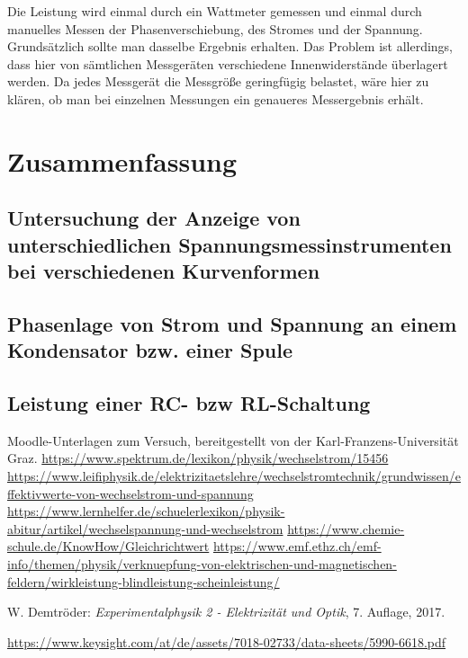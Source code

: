 \documentclass{article}
\begin{document}
Die Leistung wird einmal durch ein Wattmeter gemessen und einmal durch manuelles Messen der Phasenverschiebung, des Stromes und der Spannung. Grundsätzlich sollte man dasselbe Ergebnis erhalten. Das Problem ist allerdings, dass hier von sämtlichen Messgeräten verschiedene Innenwiderstände überlagert werden.  Da jedes Messgerät die Messgröße geringfügig belastet, wäre hier zu klären, ob man bei einzelnen Messungen ein genaueres Messergebnis erhält. 



\section{Zusammenfassung}

\subsection{Untersuchung  der  Anzeige  von  unterschiedlichen  Spannungsmessinstrumenten  bei verschiedenen Kurvenformen }






\subsection{Phasenlage von Strom und Spannung an einem Kondensator bzw. einer Spule}


\subsection{Leistung einer RC- bzw RL-Schaltung}




\begin{thebibliography}{9}
 Moodle-Unterlagen zum Versuch, bereitgestellt von der Karl-Franzens-Universität Graz.
 \url{https://www.spektrum.de/lexikon/physik/wechselstrom/15456}
 \url{https://www.leifiphysik.de/elektrizitaetslehre/wechselstromtechnik/grundwissen/effektivwerte-von-wechselstrom-und-spannung}
 \url{https://www.lernhelfer.de/schuelerlexikon/physik-abitur/artikel/wechselspannung-und-wechselstrom}
 \url{https://www.chemie-schule.de/KnowHow/Gleichrichtwert}
 \url{https://www.emf.ethz.ch/emf-info/themen/physik/verknuepfung-von-elektrischen-und-magnetischen-feldern/wirkleistung-blindleistung-scheinleistung/}

 W. Demtröder: \emph{Experimentalphysik 2 - Elektrizität  und Optik}, 7. Auflage, 2017.

 \url{https://www.keysight.com/at/de/assets/7018-02733/data-sheets/5990-6618.pdf}
\end{thebibliography}
\end{document}
